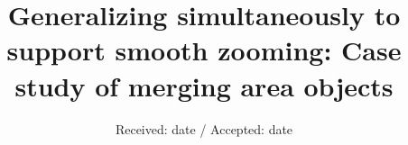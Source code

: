 \documentclass[twocolumn]{svjour3}          %
\begin{document}
\title{Generalizing simultaneously to support smooth zooming:
Case study of merging area objects%
}





\institute{
}

\date{Received: date / Accepted: date}





\maketitle
\end{document}
